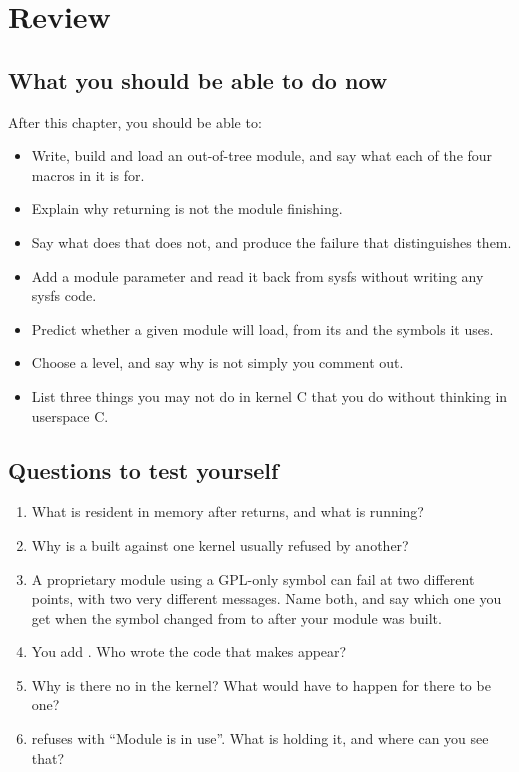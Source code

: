 
\section{Review}
\label{c4:sec:review}

\subsection*{What you should be able to do now}
After this chapter, you should be able to:
\begin{itemize}
  \item Write, build and load an out-of-tree module, and say what each of the four macros in it is
    for.
  \item Explain why  returning is not the module finishing.
  \item Say what  does that  does not, and produce the failure that
    distinguishes them.
  \item Add a module parameter and read it back from sysfs without writing any sysfs code.
  \item Predict whether a given module will load, from its  and the symbols it
    uses.
  \item Choose a  level, and say why  is not simply  you
    comment out.
  \item List three things you may not do in kernel C that you do without thinking in userspace C.
\end{itemize}

\subsection*{Questions to test yourself}
\begin{enumerate}
  \item What is resident in memory after  returns, and what is running?
  \item Why is a  built against one kernel usually refused by another?
  \item A proprietary module using a GPL-only symbol can fail at two different points, with two very
    different messages. Name both, and say which one you get when the symbol changed from
     to  after your module was built.
  \item You add . Who wrote the code that makes
     appear?
  \item Why is there no  in the kernel? What would have to happen for there to be one?
  \item {} refuses with ``Module is in use''. What is holding it, and where can you see
    that?
\end{enumerate}

